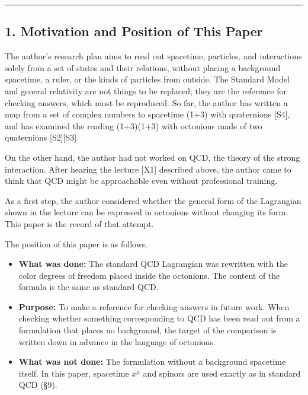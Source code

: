 \documentclass[
  a4paper,
]{article}
\providecommand{\tightlist}{%
  \setlength{\itemsep}{0pt}\setlength{\parskip}{0pt}}
\begin{document}
\begin{center}\rule{0.5\linewidth}{0.5pt}\end{center}

\subsection{1. Motivation and Position of This
Paper}\label{motivation-and-position-of-this-paper}

The author's research plan aims to read out spacetime, particles, and
interactions solely from a set of states and their relations, without
placing a background spacetime, a ruler, or the kinds of particles from
outside. The Standard Model and general relativity are not things to be
replaced; they are the reference for checking answers, which must be
reproduced. So far, the author has written a map from a set of complex
numbers to spacetime (1+3) with quaternions {[}S4{]}, and has examined
the reading (1+3)(1+3) with octonions made of two quaternions
{[}S2{]}{[}S3{]}.

On the other hand, the author had not worked on QCD, the theory of the
strong interaction. After hearing the lecture {[}X1{]} described above,
the author came to think that QCD might be approachable even without
professional training.

As a first step, the author considered whether the general form of the
Lagrangian shown in the lecture can be expressed in octonions without
changing its form. This paper is the record of that attempt.

The position of this paper is as follows.

\begin{itemize}
\tightlist
\item
  \textbf{What was done:} The standard QCD Lagrangian was rewritten with
  the color degrees of freedom placed inside the octonions. The content
  of the formula is the same as standard QCD.
\item
  \textbf{Purpose:} To make a reference for checking answers in future
  work. When checking whether something corresponding to QCD has been
  read out from a formulation that places no background, the target of
  the comparison is written down in advance in the language of
  octonions.
\item
  \textbf{What was not done:} The formulation without a background
  spacetime itself. In this paper, spacetime \(x^\mu\) and spinors are
  used exactly as in standard QCD (§9).
\end{itemize}
\end{document}
